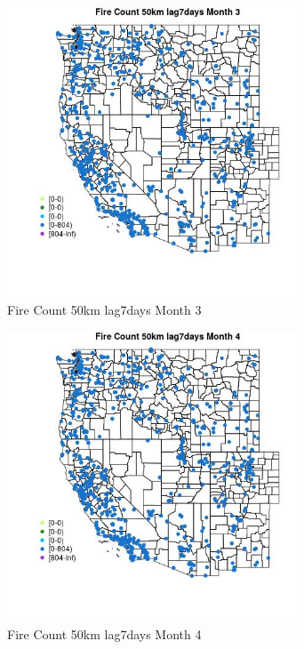 \begin{figure} 
\centering  
\includegraphics[width=0.77\textwidth]{Code_Outputs/Report_ML_input_PM25_Step4_part_f_de_duplicated_aveswNAs_MapObsMo3Fire_Count_50km_lag7days.jpg} 
\caption{\label{fig:Report_ML_input_PM25_Step4_part_f_de_duplicated_aveswNAsMapObsMo3Fire_Count_50km_lag7days}Fire Count 50km lag7days Month 3} 
\end{figure} 
 

\begin{figure} 
\centering  
\includegraphics[width=0.77\textwidth]{Code_Outputs/Report_ML_input_PM25_Step4_part_f_de_duplicated_aveswNAs_MapObsMo4Fire_Count_50km_lag7days.jpg} 
\caption{\label{fig:Report_ML_input_PM25_Step4_part_f_de_duplicated_aveswNAsMapObsMo4Fire_Count_50km_lag7days}Fire Count 50km lag7days Month 4} 
\end{figure} 
 

